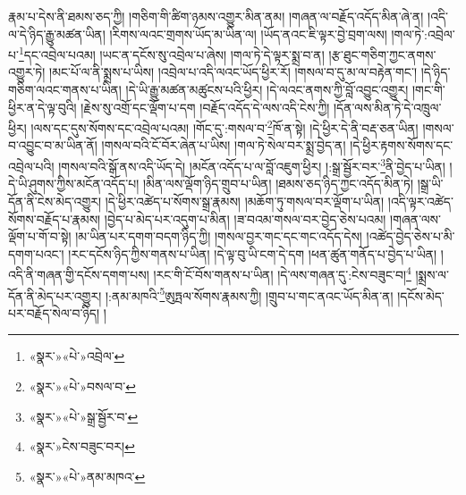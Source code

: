 རྣམ་པ་དེས་ནི་ཐམས་ཅད་ཀྱི། །གཅིག་གི་ཚིག་ཉམས་འགྱུར་མིན་ནམ། །གཞན་ལ་བརྗོད་འདོད་མིན་ཞེ་ན། །འདི་ལ་དེ་ཉིད་རྒྱུ་མཚན་ཡིན། །རིགས་ལའང་གྲགས་ཡོད་མ་ཡིན་ལ། །ཡོད་ནའང་ཇི་ལྟར་བྱེ་བྲག་ལས། །གལ་ཏེ་:འབྲེལ་པ་\footnote{«སྣར་»«པེ་»འབྲེལ་}དང་འབྲེལ་པའམ། །ཡང་ན་དངོས་སུ་འབྲེལ་པ་ཞེས། །གལ་ཏེ་དེ་ལྟར་སྨྲ་བ་ན། །རྩ་ཐུང་གཅིག་ཀྱང་ནགས་འགྱུར་ཏེ། །མང་པོ་ལ་ནི་སྨྲས་པ་ཡིས། །འབྲེལ་པ་འདི་ལའང་ཡོད་ཕྱིར་རོ། །གསལ་བ་དུ་མ་ལ་བརྟེན་གང་། །དེ་ཉིད་གཅིག་ལའང་གནས་པ་ཡིན། །དེ་ཡི་རྒྱུ་མཚན་མཚུངས་པའི་ཕྱིར། །དེ་ལའང་ནགས་ཀྱི་བློ་འབྱུང་འགྱུར། །གང་གི་ཕྱིར་ན་དེ་ལྟ་བུའི། །རྗེས་སུ་འགྲོ་དང་ལྡོག་པ་དག །བརྗོད་འདོད་དེ་ལས་འདི་ངེས་ཀྱི། །དོན་ལས་མིན་ཏེ་དེ་འཁྲུལ་ཕྱིར། །ལས་དང་དུས་སོགས་དང་འབྲེལ་པའམ། །གོང་དུ་:གསལ་བ་\footnote{«སྣར་»«པེ་»བསལ་བ་}ཁོ་ན་སྟེ། །དེ་ཕྱིར་དེ་ནི་བརྡ་ཅན་ཡིན། །གསལ་བ་འབྱུང་བ་མ་ཡིན་ནོ། །གསལ་བའི་ངོ་བོར་ཞེན་པ་ཡིས། །གལ་ཏེ་སེལ་བར་སྨྲ་བྱེད་ན། །དེ་ཕྱིར་རྟགས་སོགས་དང་འབྲེལ་པའི། །གསལ་བའི་སྒོ་ནས་འདི་ཡོད་དེ། །མངོན་འདོད་པ་ལ་བློ་འཇུག་ཕྱིར། །:སྒྲ་སྦྱོར་བར་\footnote{«སྣར་»«པེ་»སྒྲ་སྦྱོར་བ་}ནི་བྱེད་པ་ཡིན། །དེ་ཡི་ཤུགས་ཀྱིས་མངོན་འདོད་པ། །མིན་ལས་ལྡོག་ཉིད་གྲུབ་པ་ཡིན། །ཐམས་ཅད་ཉིད་ཀྱང་འདོད་མིན་ཏེ། །སྒྲ་ཡི་དོན་ནི་ངེས་མེད་འགྱུར། །དེ་ཕྱིར་འཚེད་པ་སོགས་སྒྲ་རྣམས། །མཆོག་ཏུ་གསལ་བར་ལྡོག་པ་ཡིན། །འདི་ལྟར་འཚེད་སོགས་བརྗོད་པ་རྣམས། །བྱེད་པ་མེད་པར་འདུག་པ་མིན། །ཟ་བའམ་གསལ་བར་བྱེད་ཅེས་པའམ། །གཞན་ལས་ལྡོག་པ་གོ་བ་སྟེ། །མ་ཡིན་པར་དགག་བདག་ཉིད་ཀྱི། །གསལ་བྱར་གང་དང་གང་འདོད་དེས། །འཚེད་བྱེད་ཅེས་པ་མི་དགག་པའང་། །རང་དངོས་ཉིད་ཀྱིས་གནས་པ་ཡིན། །དེ་ལྟ་བུ་ཡི་ངག་དེ་དག །ཕན་ཚུན་གནོད་པ་བྱེད་པ་ཡིན། །འདི་ནི་གཞན་གྱི་དངོས་དགག་པས། །རང་གི་ངོ་བོས་གནས་པ་ཡིན། །དེ་ལས་གཞན་དུ་:ངེས་བཟུང་བ།\footnote{«སྣར་»ངེས་བཟུང་བར།} །སྨྲས་ལ་དོན་ནི་མེད་པར་འགྱུར། །:ནམ་མཁའི་\footnote{«སྣར་»«པེ་»ནམ་མཁའ་}ཨུཏྤལ་སོགས་རྣམས་ཀྱི། །གྲུབ་པ་གང་ནའང་ཡོད་མིན་ན། །དངོས་མེད་པར་བརྗོད་སེལ་བ་ཉིད། །
